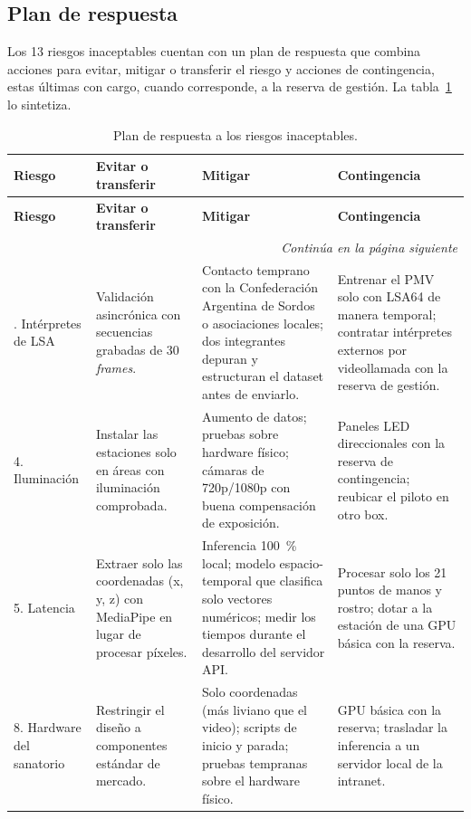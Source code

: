 \subsection{Plan de respuesta}

Los 13 riesgos inaceptables cuentan con un plan de respuesta que combina acciones para evitar, mitigar o transferir el riesgo y acciones de contingencia, estas últimas con cargo, cuando corresponde, a la reserva de gestión. La tabla~\ref{tab:respuesta} lo sintetiza.

{\footnotesize
\setlength{\tabcolsep}{4pt}
\begin{longtable}{@{}p{1.5cm}p{3.5cm}p{5.0cm}p{4.9cm}@{}}
\caption{Plan de respuesta a los riesgos inaceptables.}\label{tab:respuesta}\\
\toprule
\textbf{Riesgo} & \textbf{Evitar o transferir} & \textbf{Mitigar} & \textbf{Contingencia} \\
\midrule
\endfirsthead
\toprule
\textbf{Riesgo} & \textbf{Evitar o transferir} & \textbf{Mitigar} & \textbf{Contingencia} \\
\midrule
\endhead
\midrule
\multicolumn{4}{r}{\emph{Continúa en la página siguiente}}\\
\endfoot
\bottomrule
\endlastfoot
1. Intérpretes de LSA & Validación asincrónica con secuencias grabadas de 30 \emph{frames}. & Contacto temprano con la Confederación Argentina de Sordos o asociaciones locales; dos integrantes depuran y estructuran el dataset antes de enviarlo. & Entrenar el PMV solo con LSA64 de manera temporal; contratar intérpretes externos por videollamada con la reserva de gestión. \\
4. Iluminación & Instalar las estaciones solo en áreas con iluminación comprobada. & Aumento de datos; pruebas sobre hardware físico; cámaras de 720p/1080p con buena compensación de exposición. & Paneles LED direccionales con la reserva de contingencia; reubicar el piloto en otro box. \\
5. Latencia & Extraer solo las coordenadas (x, y, z) con MediaPipe en lugar de procesar píxeles. & Inferencia 100~\% local; modelo espacio-temporal que clasifica solo vectores numéricos; medir los tiempos durante el desarrollo del servidor API. & Procesar solo los 21 puntos de manos y rostro; dotar a la estación de una GPU básica con la reserva. \\
8. Hardware del sanatorio & Restringir el diseño a componentes estándar de mercado. & Solo coordenadas (más liviano que el video); scripts de inicio y parada; pruebas tempranas sobre el hardware físico. & GPU básica con la reserva; trasladar la inferencia a un servidor local de la intranet. \\

\end{longtable}}
